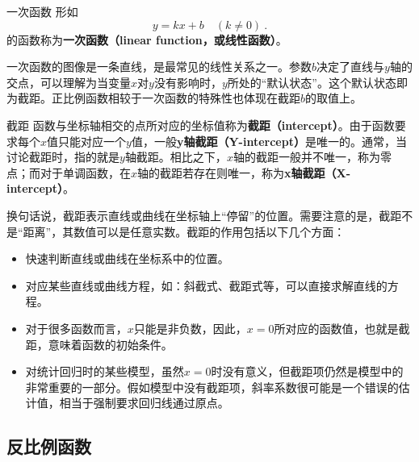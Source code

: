\begin{definition}{一次函数}
形如
\begin{equation}
y = kx+b\quad(k\neq0)~.
\end{equation}
的函数称为\textbf{一次函数（linear function，或线性函数）}。
\end{definition}

一次函数的图像是一条直线，是最常见的线性关系之一。参数$b$决定了直线与$y$轴的交点，可以理解为当变量$x$对$y$没有影响时，$y$所处的“默认状态”。这个默认状态即为截距。正比例函数相较于一次函数的特殊性也体现在截距$b$的取值上。

\begin{definition}{截距}
函数与坐标轴相交的点所对应的坐标值称为\textbf{截距（intercept）}。由于函数要求每个$x$值只能对应一个$y$值，一般\textbf{y轴截距（Y-intercept）}是唯一的。通常，当讨论截距时，指的就是$y$轴截距。相比之下，$x$轴的截距一般并不唯一，称为零点；而对于单调函数，在$x$轴的截距若存在则唯一，称为\textbf{x轴截距（X-intercept）}。
\end{definition}

换句话说，截距表示直线或曲线在坐标轴上“停留”的位置。需要注意的是，截距不是“距离”，其数值可以是任意实数。截距的作用包括以下几个方面：
\begin{itemize}
	•	快速定位图像：截距帮助我们迅速了解直线或曲线在坐标系中的位置。
	•	解方程的依据：在某些方程形式中，如斜截式和截距式，截距可以直接用于求解或确定直线的方程。
	•	初始条件的表示：对于许多实际问题，当  x  只能为非负值时， x = 0  对应的函数值（即截距）通常代表了函数的初始状态或初始条件。
	•	统计模型中的重要性：在回归分析中，即便  x = 0  时没有实际意义，截距项仍然是模型中的重要组成部分。如果没有截距项，模型会强制回归线通过原点，可能导致斜率的估计值出现偏差。
\item 快速判断直线或曲线在坐标系中的位置。
\item 对应某些直线或曲线方程，如：斜截式、截距式等，可以直接求解直线的方程。
\item 对于很多函数而言，$x$只能是非负数，因此，$x=0$所对应的函数值，也就是截距，意味着函数的初始条件。
\item 对统计回归时的某些模型，虽然$x=0$时没有意义，但截距项仍然是模型中的非常重要的一部分。假如模型中没有截距项，斜率系数很可能是一个错误的估计值，相当于强制要求回归线通过原点。
\end{itemize}





\subsection{反比例函数}

